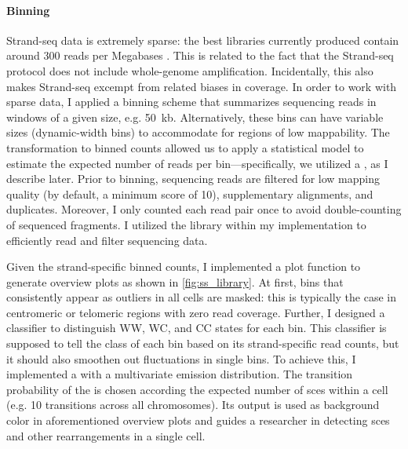 \paragraph{Binning}
Strand-seq data is extremely sparse: the best libraries currently produced
contain around 300 reads per Megabases \citep{Chaisson2017,Sanders2017}.
This is related to the fact that the Strand-seq protocol does not include
whole-genome amplification. Incidentally, this also makes Strand-seq excempt
from related biases in coverage. In
order to work with sparse data, I applied a binning scheme that summarizes
sequencing reads in windows of a given size, e.g. 50~kb. Alternatively, these
bins can have variable sizes (dynamic-width bins) to accommodate for regions of
low mappability. The transformation to binned counts allowed us to apply a
statistical model to estimate the expected number of reads per
bin---specifically, we utilized a ,
as I describe
later. Prior to binning, sequencing reads are filtered for low mapping quality
(by default, a minimum score of 10), supplementary alignments, and \pcr duplicates.
Moreover, I only counted each read pair once to avoid double-counting of
sequenced fragments. I utilized the \htslib library within my implementation
to efficiently read and filter sequencing data.

Given the strand-specific binned counts, I implemented a plot function to
generate overview plots as shown in \cref{fig:ss_library}. At first, bins that
consistently appear as outliers in all cells are masked: this is typically the
case in centromeric or telomeric regions with zero read coverage. Further, I designed a classifier to
distinguish WW, WC, and CC states for each bin. This classifier is supposed to
tell the class of each bin based on its strand-specific read counts, but it
should also smoothen out fluctuations in single bins.
To achieve this, I implemented a \hmm with a multivariate \nb
emission distribution. The transition probability of the \hmm is chosen
according the expected number of \acp{sce} within a cell (e.g. 10 transitions
across all chromosomes). Its output is used as background color in
aforementioned overview plots and guides a researcher in detecting \acp{sce} and
other rearrangements in a single cell.

